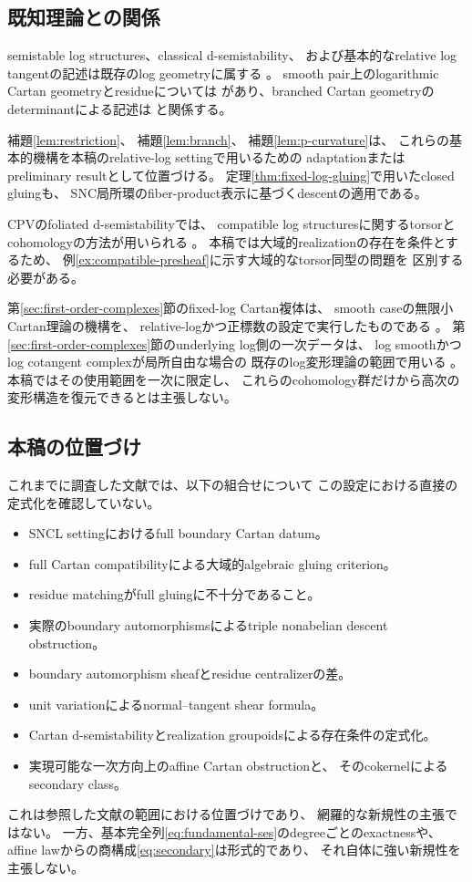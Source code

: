 \documentclass[uplatex,dvipdfmx,11pt]{jsarticle}
\numberwithin{equation}{section}
\theoremstyle{plain}
\theoremstyle{definition}
\theoremstyle{remark}
\begin{document}
\subsection{既知理論との関係}

semistable log structures、classical d-semistability、
および基本的なrelative log tangentの記述は既存のlog geometryに属する
\cite{Kato89,PB,CPV}。
smooth pair上のlogarithmic Cartan geometryとresidueについては
\cite{BDM}があり、branched Cartan geometryのdeterminantによる記述は
\cite{BD}と関係する。

補題\ref{lem:restriction}、
補題\ref{lem:branch}、
補題\ref{lem:p-curvature}は、
これらの基本的機構を本稿のrelative-log settingで用いるための
adaptationまたはpreliminary resultとして位置づける。
定理\ref{thm:fixed-log-gluing}で用いたclosed gluingも、
SNC局所環のfiber-product表示に基づくdescentの適用である。

CPVのfoliated d-semistabilityでは、
compatible log structuresに関するtorsorとcohomologyの方法が用いられる
\cite{CPV}。
本稿では大域的realizationの存在を条件とするため、
例\ref{ex:compatible-presheaf}に示す大域的なtorsor同型の問題を
区別する必要がある。

第\ref{sec:first-order-complexes}節のfixed-log Cartan複体は、
smooth caseの無限小Cartan理論の機構を、
relative-logかつ正標数の設定で実行したものである
\cite{BDS}。
第\ref{sec:first-order-complexes}節のunderlying log側の一次データは、
log smoothかつlog cotangent complexが局所自由な場合の
既存のlog変形理論の範囲で用いる
\cite{Kato89,Felten}。
本稿ではその使用範囲を一次に限定し、
これらのcohomology群だけから高次の変形構造を復元できるとは主張しない。

\subsection{本稿の位置づけ}

これまでに調査した文献では、以下の組合せについて
この設定における直接の定式化を確認していない。
\begin{itemize}
\item SNCL settingにおけるfull boundary Cartan datum。
\item full Cartan compatibilityによる大域的algebraic gluing criterion。
\item residue matchingがfull gluingに不十分であること。
\item 実際のboundary automorphismsによるtriple nonabelian descent obstruction。
\item boundary automorphism sheafとresidue centralizerの差。
\item unit variationによるnormal--tangent shear formula。
\item Cartan d-semistabilityとrealization groupoidsによる存在条件の定式化。
\item 実現可能な一次方向上のaffine Cartan obstructionと、
そのcokernelによるsecondary class。
\end{itemize}
これは参照した文献の範囲における位置づけであり、
網羅的な新規性の主張ではない。
一方、基本完全列\eqref{eq:fundamental-ses}のdegreeごとのexactnessや、
affine lawからの商構成\eqref{eq:secondary}は形式的であり、
それ自体に強い新規性を主張しない。
\end{document}
